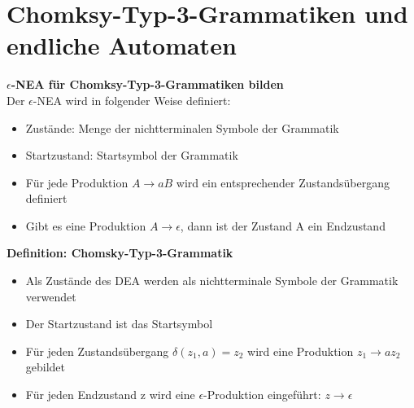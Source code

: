 \documentclass{scrreprt}
\newcommand\tab[1][1cm]{\hspace*{#1}}
\begin{document}
\section{Chomksy-Typ-3-Grammatiken und endliche Automaten}
\textbf{$\epsilon$-NEA für Chomksy-Typ-3-Grammatiken bilden}
\\\tab Der $\epsilon$-NEA wird in folgender Weise definiert:
\begin{itemize}
    \item Zustände: Menge der nichtterminalen Symbole der Grammatik
    \item Startzustand: Startsymbol der Grammatik
    \item Für jede Produktion $A \rightarrow aB$ wird ein entsprechender Zustandsübergang definiert
    \item Gibt es eine Produktion $A \rightarrow \epsilon$, dann ist der Zustand A ein Endzustand
\end{itemize}
\textbf{Definition: Chomsky-Typ-3-Grammatik}
\begin{itemize}
    \item Als Zustände des DEA werden als nichtterminale Symbole der Grammatik verwendet
    \item Der Startzustand ist das Startsymbol
    \item Für jeden Zustandsübergang $\delta (z_1,a)=z_2$ wird eine Produktion $z_1 \rightarrow a z_2$ gebildet
    \item Für jeden Endzustand z wird eine $\epsilon$-Produktion eingeführt: $z \rightarrow \epsilon$
\end{itemize}
\end{document}
